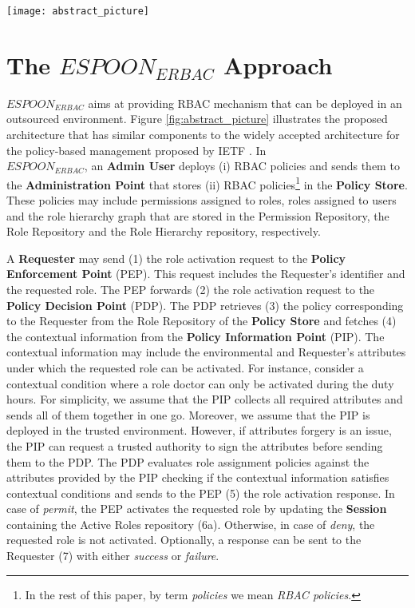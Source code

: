 \documentclass[final,5p,times,twocolumn]{elsarticle}
\begin{document}
\begin{figure*} [htp]
\centering
\texttt{[image: abstract\_picture]}
\caption{The $\mathit{ESPOON_{ERBAC}}$ architecture for enforcing RBAC policies in outsourced environments}
\label{fig:abstract_picture}
\end{figure*}

\section{The $\mathit{ESPOON_{ERBAC}}$ Approach}
\label{sec:approach}

$\mathit{ESPOON_{ERBAC}}$ aims at providing RBAC mechanism that can be deployed in an outsourced environment. Figure \ref{fig:abstract_picture} illustrates the proposed architecture that has similar components to the widely accepted architecture for the policy-based management proposed by IETF \cite{Yavatkar2000}. In \\ $\mathit{ESPOON_{ERBAC}}$, an \textbf{Admin User} deploys (i) RBAC policies and sends them to the \textbf{Administration Point} that stores (ii) RBAC policies\footnote{In the rest of this paper, by term \emph{policies} we mean \emph{RBAC policies}.} in the \textbf{Policy Store}. These policies may include permissions assigned to roles, roles assigned to users and the role hierarchy graph that are stored in the Permission Repository, the Role Repository and the Role Hierarchy repository, respectively. 

A \textbf{Requester} may send (1) the role activation request to the \textbf{Policy Enforcement Point} (PEP). This request includes the Requester's identifier and the requested role. The PEP forwards (2) the role activation request to the \textbf{Policy Decision Point} (PDP). The PDP retrieves (3) the policy corresponding to the Requester from the Role Repository of the \textbf{Policy Store} and fetches (4) the contextual information from the \textbf{Policy Information Point} (PIP). The contextual information may include the environmental and Requester's attributes under which the requested role can be activated. For instance, consider a contextual condition where a role doctor can only be activated during the duty hours. For simplicity, we assume that the PIP collects all required attributes and sends all of them together in one go. Moreover, we assume that the PIP is deployed in the trusted environment. However, if attributes forgery is an issue, the PIP can request a trusted authority to sign the attributes before sending them to the PDP. The PDP evaluates role assignment policies against the attributes provided by the PIP checking if the contextual information satisfies contextual conditions and sends to the PEP (5) the role activation response. In case of \emph{permit}, the PEP activates the requested role by updating the \textbf{Session} containing the Active Roles repository (6a). Otherwise, in case of \emph{deny}, the requested role is not activated. Optionally, a response can be sent to the Requester (7) with either \emph{success} or \emph{failure}.
\end{document}
